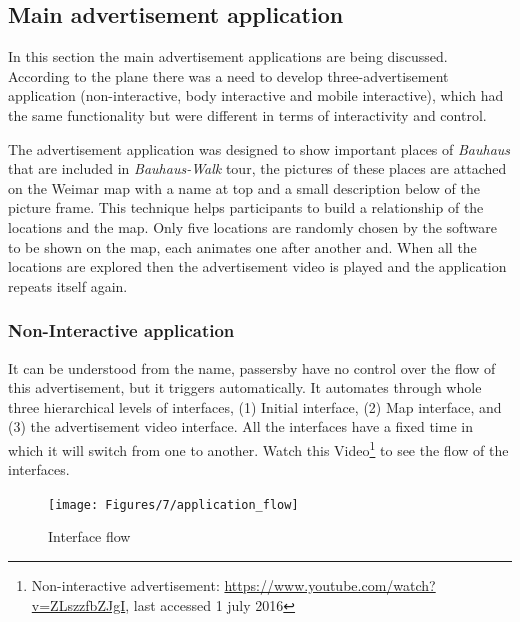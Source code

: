 \subsection{Main advertisement application}
In this section the main advertisement applications are being discussed.
According to the plane there was a need to develop three-advertisement application (non-interactive, body interactive and mobile interactive), which had the same functionality but were different in terms of interactivity and control.

The advertisement application was designed to show important places of \emph{Bauhaus} that are included in \emph{Bauhaus-Walk} tour, the pictures of these places are attached on the Weimar map with a name at top and a small description below of the picture frame. This technique helps participants to build a relationship of the locations and the map. Only five locations are randomly chosen by the software to be shown on the map, each animates one after another and. When all the locations are explored then the advertisement video is played and the application repeats itself again.


\subsubsection{Non-Interactive application}
It can be understood from the name, passersby have no control over the flow of this advertisement, but it triggers automatically. It automates through whole three hierarchical levels of interfaces, (1) Initial interface, (2) Map interface, and (3) the advertisement video interface. All the interfaces have a fixed time in which it will switch from one to another. Watch this Video\footnote{Non-interactive advertisement: \url{https://www.youtube.com/watch?v=ZLszzfbZJgI}, last accessed 1 july 2016} to see the flow of the interfaces.


\begin{figure}[H]
    \centering
    \texttt{[image: Figures/7/application\_flow]}
    \caption{Interface flow}%
    \label{fig:InterfaceFlow}%
\end{figure}

